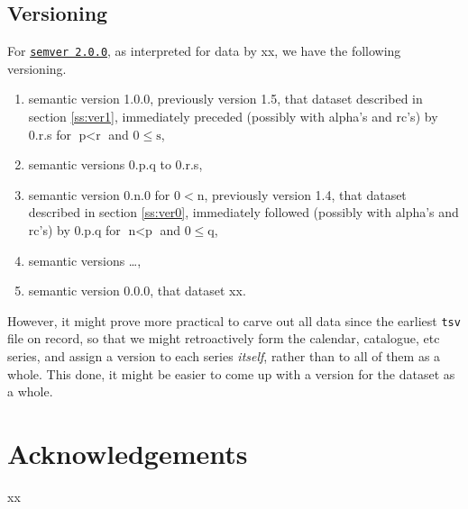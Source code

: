 \documentclass{amsart}%
\newcommand{\code}[1]{\texttt{#1}}%
\theoremstyle{plain}
\theoremstyle{definition}
\theoremstyle{remark}
\theoremstyle{definition}
\theoremstyle{remark}
\begin{document}
\subsection{Versioning}
\label{ss:versioning}
For \href{https://semver.org}{\code{semver 2.0.0}}, as interpreted for data by xx, we have the following versioning.%
\begin{enumerate}
\item semantic version 1.0.0, previously version 1.5, that dataset described in section \ref{ss:ver1}, immediately preceded (possibly with alpha's and rc's) by 0.r.s for \(\text{p}<\text{r}\) and \(0\leq\text{s}\),
\item semantic versions 0.p.q to 0.r.s,
\item semantic version 0.n.0 for \(0<\text{n}\), %
previously version 1.4, that dataset described in section \ref{ss:ver0}, immediately followed (possibly with alpha's and rc's) by 0.p.q for \(\text{n}<\text{p}\) and \(0\leq\text{q}\),
\item semantic versions \ldots,
\item semantic version 0.0.0, that dataset xx.%
\end{enumerate}
However, it might prove more practical to carve out all data since the earliest \code{tsv} file on record, so that we might retroactively form the calendar, catalogue, etc series, and assign a version to each series \emph{itself}, rather than to all of them as a whole. This done, it might be easier to come up with a version for the dataset as a whole.%
%
%
%
%
%
\section*{Acknowledgements}
\label{s:acknow}
xx
%
%
%
%
%
%
%
%
%
\end{document}
